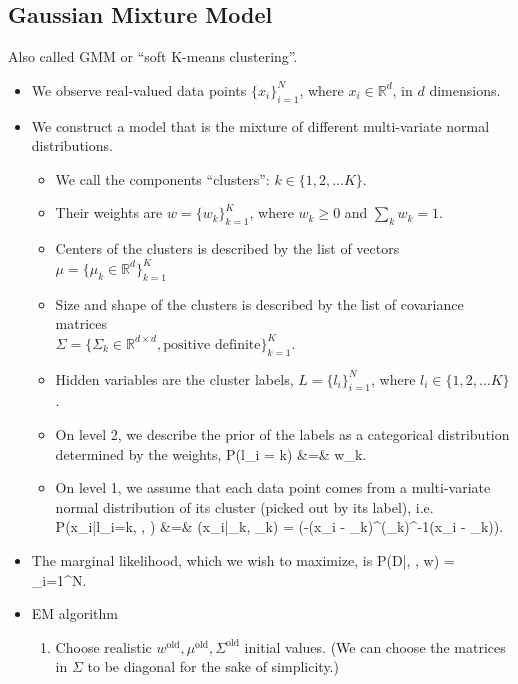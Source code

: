 \subsection{Gaussian Mixture Model}
\no Also called GMM or ``soft K-means clustering''.
\begin{itemize}
	\item We observe real-valued data points $\{x_i\}_{i=1}^N$, where $x_i \in \mathds{R}^d$, in $d$ dimensions.
	\item We construct a model that is the mixture of different multi-variate normal distributions.
	\begin{itemize}
		\item We call the components ``clusters'': $k \in \{1, 2, \ldots K\}$.
		\item Their weights are  $w = \{w_k\}_{k=1}^K$, where $w_k \geq 0$ and $\sum_k w_k = 1$.
		\item Centers of the clusters is described by the list of vectors $\mu = \{\mu_k \in \mathds{R}^d\}_{k=1}^K$
		\item Size and shape of the clusters is described by the list of covariance matrices \\ $\Sigma = \{\Sigma_k \in \mathds{R}^{d\times d}, \text{positive definite}\}_{k=1}^K$.
		\item Hidden variables are the cluster labels, $L = \{l_i\}_{i=1}^N$, where $l_i \in \{1, 2,\ldots K\}$.
		\item On level 2, we describe the prior of the labels as a categorical distribution determined by the weights,
		\ba
			P(l_i = k) &=& w_k.
		\ea
		\item On level 1, we assume that each data point comes from a multi-variate normal distribution of its cluster (picked out by its label), i.e.
		\ba
			P(x_i\;|\;l_i=k, \mu, \Sigma) &=& (x_i\;|\;\mu_k, \Sigma_k) =  \exp\left(-(x_i - \mu_k)^\top (\Sigma_k)^{-1}(x_i - \mu_k)\right).
		\ea
	\end{itemize}
	\item The marginal likelihood, which we wish to maximize, is
	\be
		P(D\;|\;\mu, \Sigma, w) = \prod_{i=1}^N\left[\sum_{k=1}^K w_k\, \text{Normal}(x_i\;|\;\mu_k, \Sigma_k)\right].
	\ee
	\item EM algorithm
	\begin{enumerate}
		\item Choose realistic $w^\text{old}, \mu^\text{old}, \Sigma^\text{old}$ initial values. (We can choose the matrices in $\Sigma$ to be diagonal for the sake of simplicity.)

\end{enumerate}
\end{itemize}
